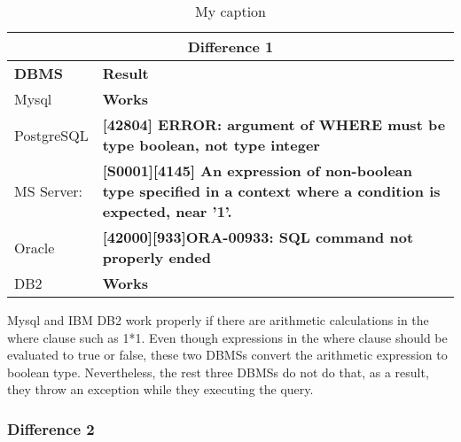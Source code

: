 \begin{table}[h]
\centering
\caption{My caption}
\label{my-label}
\begin{tabular}{|p{2cm}|p{12cm}|}
\hline
\multicolumn{2}{|c|}{\textbf{Difference 1}}                                                                                                                             \\ \hline
\textbf{DBMS} & \textbf{Result}                                                                                                                                         \\ \hline
Mysql         & {\color[HTML]{009901} \textbf{Works}}                                                                                                                   \\ \hline
PostgreSQL    & {\color[HTML]{FE0000} \textbf{{[}42804{]} ERROR: argument of WHERE must be type boolean, not type integer}}                                             \\ \hline
MS Server:    & {\color[HTML]{FE0000} \textbf{{[}S0001{]}{[}4145{]} An expression of non-boolean type specified in a context where a condition is expected, near '1'.}} \\ \hline
Oracle        & {\color[HTML]{FE0000} \textbf{{[}42000{]}{[}933{]}ORA-00933: SQL command not properly ended}}                                                           \\ \hline
DB2           & {\color[HTML]{009901} \textbf{Works}}                                                                                                                   \\ \hline
\end{tabular}
\end{table}


Mysql and IBM DB2 work properly if there are arithmetic calculations in the where clause such as 1*1. Even though expressions in the where clause should be evaluated to true or false, these two DBMSs convert the arithmetic expression to boolean type. Nevertheless, the rest three DBMSs do not do that, as a result, they throw an exception while they executing the query.    


\subsubsection{Difference 2}



